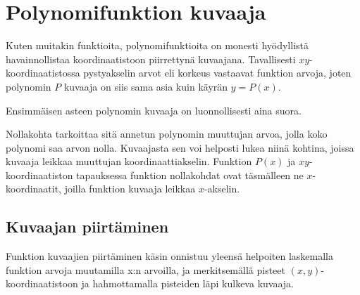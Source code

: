 \chapter{Polynomifunktion kuvaaja}
Kuten muitakin funktioita, polynomifunktioita on monesti hyödyllistä
havainnollistaa koordinaatistoon piirrettynä kuvaajana. Tavallisesti $xy$-koordinaatistossa pystyakselin arvot eli korkeus vastaavat funktion arvoja, joten polynomin $P$ kuvaaja on siis sama asia kuin käyrän $y = P(x)$.

\begin{kuvaajapohja}{1.5}{-2}{2}{-3}{3}
\end{kuvaajapohja}

Ensimmäisen asteen polynomin kuvaaja on luonnollisesti aina suora. 

Nollakohta tarkoittaa sitä annetun polynomin muuttujan arvoa, jolla koko
polynomi saa arvon nolla. Kuvaajasta sen voi helposti lukea niinä kohtina,
joissa kuvaaja leikkaa muuttujan koordinaattiakselin. Funktion $P(x)$ ja $xy$-koordinaatiston tapauksessa funktion nollakohdat ovat täsmälleen ne $x$-koordinaatit, joilla funktion kuvaaja leikkaa $x$-akselin.

\section{Kuvaajan piirtäminen}

Funktion kuvaajien piirtäminen käsin onnistuu yleensä helpoiten laskemalla funktion arvoja muutamilla x:n arvoilla, ja merkitsemällä pisteet $(x,y)$-koordinaatistoon ja hahmottamalla pisteiden läpi kulkeva kuvaaja.

